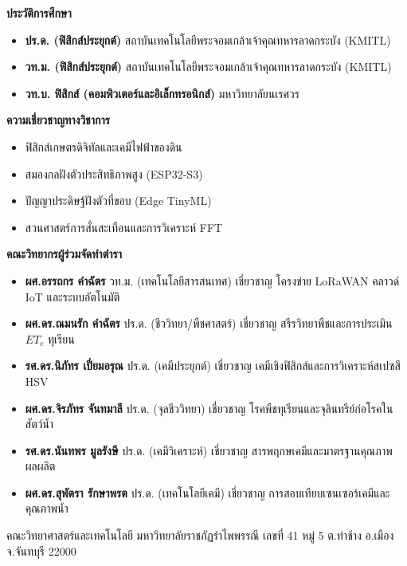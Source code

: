 \begin{minipage}[t]{0.48\textwidth}
    {\fontsize{13}{16}\selectfont\bfseries\color{rbruNavy} ประวัติการศึกษา}\\[6pt]
    \begin{itemize}[leftmargin=1.2em, itemsep=2pt, topsep=0pt]
        \item \textbf{ปร.ด. (ฟิสิกส์ประยุกต์)} สถาบันเทคโนโลยีพระจอมเกล้าเจ้าคุณทหารลาดกระบัง (KMITL)
        \item \textbf{วท.ม. (ฟิสิกส์ประยุกต์)} สถาบันเทคโนโลยีพระจอมเกล้าเจ้าคุณทหารลาดกระบัง (KMITL)
        \item \textbf{วท.บ. ฟิสิกส์ (คอมพิวเตอร์และอิเล็กทรอนิกส์)} มหาวิทยาลัยนเรศวร
    \end{itemize}

    \vspace{0.3cm}
    {\fontsize{13}{16}\selectfont\bfseries\color{rbruNavy} ความเชี่ยวชาญทางวิชาการ}\\[6pt]
    \begin{itemize}[leftmargin=1.2em, itemsep=2pt, topsep=0pt]
        \item ฟิสิกส์เกษตรดิจิทัลและเคมีไฟฟ้าของดิน
        \item สมองกลฝังตัวประสิทธิภาพสูง (ESP32-S3)
        \item ปัญญาประดิษฐ์ฝังตัวที่ขอบ (Edge TinyML)
        \item สวนศาสตร์การสั่นสะเทือนและการวิเคราะห์ FFT
    \end{itemize}
\end{minipage}
\hfill
\begin{minipage}[t]{0.48\textwidth}
    {\fontsize{13}{16}\selectfont\bfseries\color{rbruNavy} คณะวิทยากรผู้ร่วมจัดทำตำรา}\\[6pt]
    \begin{itemize}[leftmargin=1.2em, itemsep=2pt, topsep=0pt]
        \item \textbf{ผศ.อรรถกร คำฉัตร} วท.ม. (เทคโนโลยีสารสนเทศ) เชี่ยวชาญ โครงข่าย LoRaWAN คลาวด์ IoT และระบบอัตโนมัติ
        \item \textbf{ผศ.ดร.ณมนรัก คำฉัตร} ปร.ด. (ชีววิทยา/พืชศาสตร์) เชี่ยวชาญ สรีรวิทยาพืชและการประเมิน $ET_c$ ทุเรียน
        \item \textbf{รศ.ดร.นิภัทร เปี่ยมอรุณ} ปร.ด. (เคมีประยุกต์) เชี่ยวชาญ เคมีเชิงฟิสิกส์และการวิเคราะห์สเปซสี HSV
        \item \textbf{ผศ.ดร.จิรภัทร จันทมาลี} ปร.ด. (จุลชีววิทยา) เชี่ยวชาญ โรคพืชทุเรียนและจุลินทรีย์ก่อโรคในสัตว์น้ำ
        \item \textbf{รศ.ดร.นันทพร มูลรังษี} ปร.ด. (เคมีวิเคราะห์) เชี่ยวชาญ สารพฤกษเคมีและมาตรฐานคุณภาพผลผลิต
        \item \textbf{ผศ.ดร.สุพัตรา รักษาพรต} ปร.ด. (เทคโนโลยีเคมี) เชี่ยวชาญ การสอบเทียบเซนเซอร์เคมีและคุณภาพน้ำ
    \end{itemize}
\end{minipage}

\vfill
\begin{center}
    {\fontsize{10}{13}\selectfont\color{slateGrey} คณะวิทยาศาสตร์และเทคโนโลยี มหาวิทยาลัยราชภัฏรำไพพรรณี เลขที่ 41 หมู่ 5 ต.ท่าช้าง อ.เมือง จ.จันทบุรี 22000}
\end{center}
\clearpage
